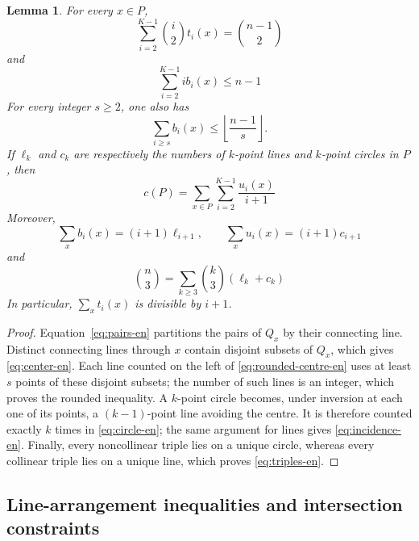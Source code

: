 \documentclass[11pt,a4paper]{article}
\newtheorem{lemma}[theorem]{Lemma}
\theoremstyle{definition}
\begin{document}
\begin{lemma}\label{lem:identities-en}
For every $x\in P$,
\begin{equation}\label{eq:pairs-en}
\sum_{i=2}^{K-1}\binom i2t_i(x)=\binom{n-1}{2}
\end{equation}
and
\begin{equation}\label{eq:center-en}
\sum_{i=2}^{K-1}i b_i(x)\le n-1
\end{equation}
For every integer $s\ge2$, one also has
\begin{equation}\label{eq:rounded-centre-en}
\sum_{i\ge s}b_i(x)\le
\left\lfloor\frac{n-1}{s}\right\rfloor.
\end{equation}
If $\ell_k$ and $c_k$ are respectively the numbers of $k$-point lines and
$k$-point circles in $P$, then
\begin{equation}\label{eq:circle-en}
c(P)=\sum_{x\in P}\sum_{i=2}^{K-1}\frac{u_i(x)}{i+1}
\end{equation}
Moreover,
\begin{equation}\label{eq:incidence-en}
\sum_xb_i(x)=(i+1)\ell_{i+1},\qquad
\sum_xu_i(x)=(i+1)c_{i+1}
\end{equation}
and
\begin{equation}\label{eq:triples-en}
\binom n3=\sum_{k\ge3}\binom k3(\ell_k+c_k)
\end{equation}
In particular, $\sum_xt_i(x)$ is divisible by $i+1$.
\end{lemma}

\begin{proof}
Equation~\eqref{eq:pairs-en} partitions the pairs of $Q_x$ by their connecting line.
Distinct connecting lines through $x$ contain disjoint subsets of $Q_x$, which gives
\eqref{eq:center-en}.  Each line counted on the left of
\eqref{eq:rounded-centre-en} uses at least $s$ points of these disjoint subsets;
the number of such lines is an integer, which proves the rounded inequality.  A
$k$-point circle becomes, under inversion at each one of its points, a $(k-1)$-point
line avoiding the centre.  It is therefore counted exactly $k$ times in
\eqref{eq:circle-en}; the same argument for lines gives
\eqref{eq:incidence-en}.  Finally, every noncollinear triple lies on a unique circle,
whereas every collinear triple lies on a unique line, which proves
\eqref{eq:triples-en}.
\end{proof}

\subsection{Line-arrangement inequalities and intersection constraints}
\end{document}
